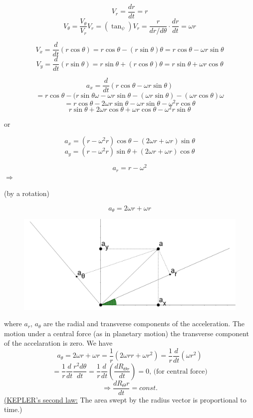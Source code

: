 \documentclass[11pt]{amsbook}
\begin{document}
\[
	V_r = \frac{dr}{dt} = r
\]
\[
	V_\theta = \frac{V_\theta}{V_r}V_r = (\tan_{\psi})V_r = \frac{r}{dr/d\theta} \cdot \frac{dr}{dt} = \omega r
\]

\[
	V_x = \frac{d}{dt} (r \cos{\theta}) = r \cos{\theta} - (r \sin{\theta})\theta = r \cos{\theta} - \omega r \sin{\theta}
\]
\[
	V_y = \frac{d}{dt}(r \sin{\theta}) = r \sin{\theta} + (r \cos{\theta})\theta = r \sin{\theta} + \omega r \cos{\theta} 
\]


\[
	a_x = \frac{d}{dt} (r \cos{\theta} - \omega r \sin{\theta})
\]
\[
	       = r \cos{\theta} - (r \sin{\theta}  \omega - \omega r \sin{\theta} - (\omega r \sin{\theta}) - (\omega r \cos{\theta})\omega	      
\]
\[
	       = r \cos{\theta} - 2 \omega r \sin{\theta} - \omega r \sin{\theta} - \omega^2r \cos{\theta}
\]
\[
	        r \sin{\theta} + 2 \omega r \cos{\theta} + \omega r \cos{\theta} - \omega^2r \sin{\theta}
\]

or

\[
	a_x = (r - \omega^2r)\cos{\theta} - (2\omega r + \omega r)\sin{\theta}
\]
\[
	a_y = (r - \omega^2r)\sin{\theta} + (2\omega r + \omega r)\cos{\theta}
\]

\[
	a_r = r - \omega^2
\]
$\Rightarrow$ \centerline{(by a rotation)}
\[
	a_\theta = 2\omega r + \omega r
\]

\begin{figure}[h]
\begin{center}
	\includegraphics[width=0.50\columnwidth] {images/b2p1-242-fig01.png}
\end{center}
\end{figure}
where $a_r$, $a_{\theta}$ are the radial and transverse components of the acceleration. The motion under a central force (as in planetary motion) the transverse component of the accelaration is zero. We have 
\[
a_{\theta} = 2\omega r + \omega r = \frac{1}{r} (2\omega rr + \omega r^2) = \frac{1}{r} \frac{d}{dt} (\omega r^2)
\]
\[
= \frac{1}{r} \frac{d}{dt} \frac{r^2d\theta}{dt} = \frac{1}{r} \frac{d}{dt} (\frac{d{R_{\Theta r}}}{dt}) = 0 \text{, (for central force)}
\]
\[
\Rightarrow \frac{d{R_\Theta r}}{dt} = const.
\]
\underline{(KEPLER's second law:} The area swept by the radius vector is proportional to time.)
\end{document}
